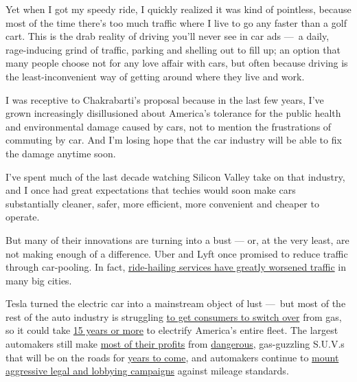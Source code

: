 Yet when I got my speedy ride, I quickly realized it was kind of
pointless, because most of the time there's too much traffic where I
live to go any faster than a golf cart. This is the drab reality of
driving you'll never see in car ads ---~a daily, rage-inducing grind of
traffic, parking and shelling out to fill up; an option that many people
choose not for any love affair with cars, but often because driving is
the least-inconvenient way of getting around where they live and work.

I was receptive to Chakrabarti's proposal because in the last few years,
I've grown increasingly disillusioned about America's tolerance for the
public health and environmental damage caused by cars, not to mention
the frustrations of commuting by car. And I'm losing hope that the car
industry will be able to fix the damage anytime soon.

I've spent much of the last decade watching Silicon Valley take on that
industry, and I once had great expectations that techies would soon make
cars substantially cleaner, safer, more efficient, more convenient and
cheaper to operate.

But many of their innovations are turning into a bust --- or, at the
very least, are not making enough of a difference. Uber and Lyft once
promised to reduce traffic through car-pooling. In fact,
\href{https://www.theverge.com/2019/8/6/20756945/uber-lyft-tnc-vmt-traffic-congestion-study-fehr-peers}{ride-hailing
services have greatly worsened traffic} in many big cities.

Tesla turned the electric car into a mainstream object of lust ---~but
most of the rest of the auto industry is struggling
\href{https://www.marketwatch.com/story/teslas-competitors-find-that-going-electric-has-its-own-set-of-problems-2019-11-04}{to
get consumers to switch over} from gas, so it could take
\href{http://energyfuse.org/americas-aging-vehicles-delay-rate-fleet-turnover/}{15
years or more} to electrify America's entire fleet. The largest
automakers still make
\href{https://www.nytimes.com/2019/09/12/business/suv-sedan-detroit-fight.html}{most
of their profits} from
\href{https://www.curbed.com/2018/9/27/17909270/pedestrian-deaths-suv-car-design}{dangerous},
gas-guzzling S.U.V.s that will be on the roads for
\href{http://energyfuse.org/americas-aging-vehicles-delay-rate-fleet-turnover/}{years
to come}, and automakers continue to
\href{https://www.latimes.com/business/story/2019-10-31/epa-trump-emissions-lawsuit}{mount
aggressive legal and lobbying campaigns} against mileage standards.


